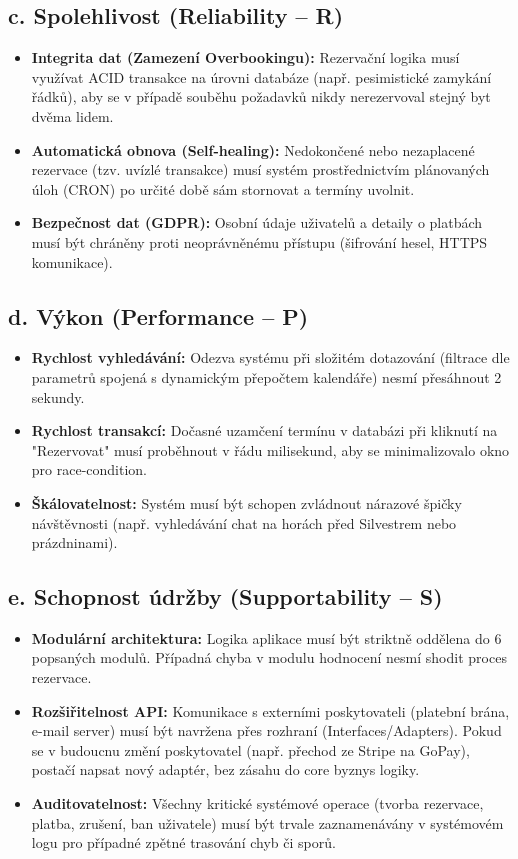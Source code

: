 \documentclass[11pt, a4paper]{article}
\begin{document}
\subsection*{c. Spolehlivost (Reliability – R)}
\begin{itemize}
    \item \textbf{Integrita dat (Zamezení Overbookingu):} Rezervační logika musí využívat ACID transakce na úrovni databáze (např. pesimistické zamykání řádků), aby se v případě souběhu požadavků nikdy nerezervoval stejný byt dvěma lidem.
    \item \textbf{Automatická obnova (Self-healing):} Nedokončené nebo nezaplacené rezervace (tzv. uvízlé transakce) musí systém prostřednictvím plánovaných úloh (CRON) po určité době sám stornovat a termíny uvolnit.
    \item \textbf{Bezpečnost dat (GDPR):} Osobní údaje uživatelů a detaily o platbách musí být chráněny proti neoprávněnému přístupu (šifrování hesel, HTTPS komunikace).
\end{itemize}

\subsection*{d. Výkon (Performance – P)}
\begin{itemize}
    \item \textbf{Rychlost vyhledávání:} Odezva systému při složitém dotazování (filtrace dle parametrů spojená s dynamickým přepočtem kalendáře) nesmí přesáhnout 2 sekundy.
    \item \textbf{Rychlost transakcí:} Dočasné uzamčení termínu v databázi při kliknutí na "Rezervovat" musí proběhnout v řádu milisekund, aby se minimalizovalo okno pro race-condition.
    \item \textbf{Škálovatelnost:} Systém musí být schopen zvládnout nárazové špičky návštěvnosti (např. vyhledávání chat na horách před Silvestrem nebo prázdninami).
\end{itemize}

\subsection*{e. Schopnost údržby (Supportability – S)}
\begin{itemize}
    \item \textbf{Modulární architektura:} Logika aplikace musí být striktně oddělena do 6 popsaných modulů. Případná chyba v modulu hodnocení nesmí shodit proces rezervace.
    \item \textbf{Rozšiřitelnost API:} Komunikace s externími poskytovateli (platební brána, e-mail server) musí být navržena přes rozhraní (Interfaces/Adapters). Pokud se v budoucnu změní poskytovatel (např. přechod ze Stripe na GoPay), postačí napsat nový adaptér, bez zásahu do core byznys logiky.
    \item \textbf{Auditovatelnost:} Všechny kritické systémové operace (tvorba rezervace, platba, zrušení, ban uživatele) musí být trvale zaznamenávány v systémovém logu pro případné zpětné trasování chyb či sporů.
\end{itemize}
\end{document}
